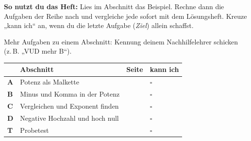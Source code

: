 \documentclass[11pt]{article}
\begin{document}
\par\smallskip
{}\par\medskip
\noindent\textbf{So nutzt du das Heft:} Lies im Abschnitt das Beispiel. Rechne dann die Aufgaben der Reihe nach und vergleiche jede sofort mit dem Lösungsheft. Kreuze „kann ich“ an, wenn du die letzte Aufgabe (\emph{Ziel}) allein schaffst.\par
\noindent Mehr Aufgaben zu einem Abschnitt: Kennung deinem Nachhilfelehrer schicken (z.\,B. „VUD mehr B“).\par\medskip
{\renewcommand{\arraystretch}{1.3}
\noindent\begin{tabular}{|>{\bfseries}p{10mm}|p{112mm}|>{\raggedleft\arraybackslash}p{10mm}|>{\centering\arraybackslash}p{14mm}|}\hline
\rowcolor{black!8} & \textbf{Abschnitt} & \textbf{Seite} & \textbf{kann ich}\\\hline
A & Potenz als Malkette & \pageref{s:A} & $\square$\\\hline
B & Minus und Komma in der Potenz & \pageref{s:B} & $\square$\\\hline
C & Vergleichen und Exponent finden & \pageref{s:C} & $\square$\\\hline
D & Negative Hochzahl und hoch null & \pageref{s:D} & $\square$\\\hline
T & Probetest & \pageref{s:T} & $\square$\\\hline
\end{tabular}}\par\bigskip
\end{document}
